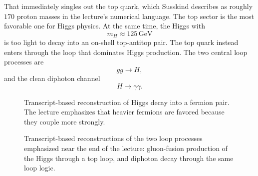 That immediately singles out the top quark, which Susskind describes as roughly \(170\) proton masses in the lecture's numerical language. The top sector is the most favorable one for Higgs physics. At the same time, the Higgs with
\begin{equation}
m_{H}\approx 125\,\mathrm{GeV}
\end{equation}
is too light to decay into an on-shell top-antitop pair. The top quark instead enters through the loop that dominates Higgs production. The two central loop processes are
\begin{equation}
gg\to H,
\end{equation}
and the clean diphoton channel
\begin{equation}
H\to \gamma\gamma.
\end{equation}

\begin{figure}
\centering
{}
\caption{Transcript-based reconstruction of Higgs decay into a fermion pair. The lecture emphasizes that heavier fermions are favored because they couple more strongly.}
\end{figure}

\begin{figure}
\centering
{}
\caption{Transcript-based reconstructions of the two loop processes emphasized near the end of the lecture: gluon-fusion production of the Higgs through a top loop, and diphoton decay through the same loop logic.}
\end{figure}

